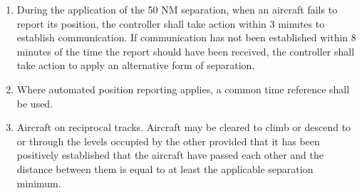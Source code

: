 \begin{enumeratesc}
\begin{enumerate}
\begin{enumerate}
            \item During the application of the 50 NM separation, when an aircraft fails to report its position, the controller shall take action within 3 minutes to establish communication. If communication has not been established within 8 minutes of the time the report should have been received, the controller shall take action to apply an alternative form of separation.
            \item Where automated position reporting applies, a common time reference shall be used.
            \item Aircraft on reciprocal tracks. Aircraft may be cleared to climb or descend to or through the levels occupied by the other provided that it has been positively established that the aircraft have passed each other and the distance between them is equal to at least the applicable separation minimum.
        \end{enumerate}
    \end{enumerate}
\end{enumeratesc}